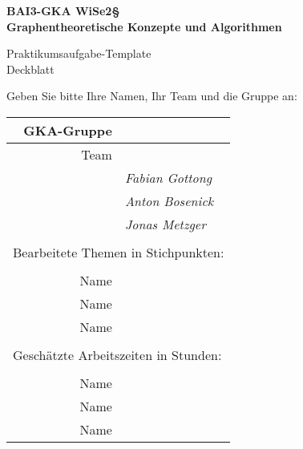 

\thispagestyle{empty}
\begin{center}

    {\large {\bf   BAI3-GKA WiSe2§ \\ Graphentheoretische Konzepte und Algorithmen \\[5mm]} }
    
{\huge Praktikumsaufgabe-Template  \\[5mm] Deckblatt}\\

\end{center}
Geben Sie bitte Ihre Namen, Ihr Team und die Gruppe  an:\\ 
				\begin{tabular}[t]{|r|l|}
				 \hline
				GKA-Gruppe&                 \raisebox{-3mm}{\rule[8mm]{100mm}{0mm} }\\ \hline    
				Team &                                                        \\ \hline			
				& \textit{ Fabian Gottong }               \\ \hline    
				& \textit{ Anton Bosenick }               \\ \hline			
				& \textit{ Jonas Metzger }             \\ \hline  			
				\multicolumn{2}{c}{}\\  			
				\multicolumn{2}{l}{Bearbeitete Themen in Stichpunkten:}\\			
				\multicolumn{2}{c}{}\\  \hline
				Name &                \\ \hline    
				Name&                  \\ \hline			
				Name&                \\ \hline 		
				\multicolumn{2}{c}{}\\  			
				\multicolumn{2}{l}{Geschätzte Arbeitszeiten in Stunden:}\\			
				\multicolumn{2}{c}{}\\  \hline
				Name&                 \\ \hline    
				Name&                  \\ \hline			
				Name&                \\ \hline 			
				\end{tabular}
~\\[4mm]
		
		
\vfill


